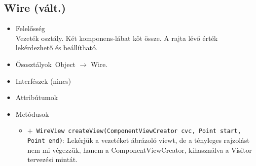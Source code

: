 \subsection{Wire (vált.)}
\begin{itemize}
\item Felelősség\\
Vezeték osztály. Két komponens-lábat köt össze. A rajta lévő érték lekérdezhető  és beállítható.
\item Ősosztályok\ Object $\rightarrow{}$ Wire.
\item Interfészek (nincs)
\item Attribútumok $\ $
\item Metódusok$\ $
\begin{itemize}
	\item[] \texttt{$+$ WireView createView(ComponentViewCreator cvc, Point start, Point end)}: Lekérjük a vezetéket ábrázoló viewt, de a tényleges rajzolást nem mi végezzük, hanem  a ComponentViewCreator, kihasználva a Visitor tervezési mintát.
\end{itemize}
\end{itemize}

